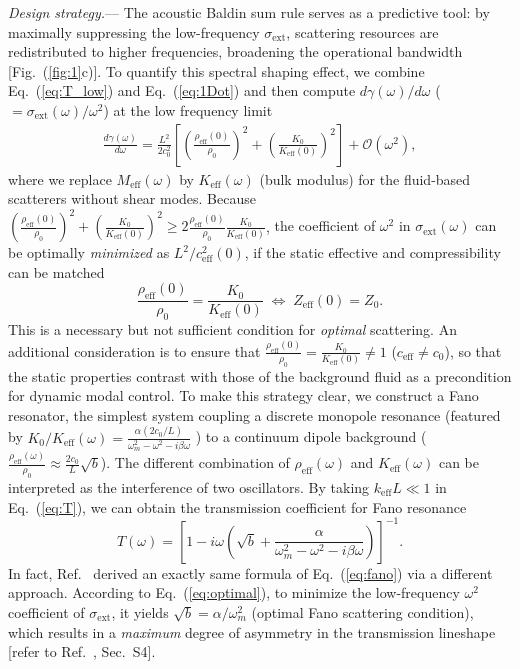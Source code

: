 \documentclass[final,5p,times,twocolumn]{elsarticle}
\begin{document}
\textit{Design strategy.}— The acoustic Baldin sum rule serves as a predictive tool: by maximally suppressing the low-frequency $\sigma_\mathrm{ext}$, scattering resources are redistributed to higher frequencies, broadening the operational bandwidth [Fig.~(\ref{fig:1}c)]. To quantify this spectral shaping effect, we combine Eq.~(\ref{eq:T_low}) and Eq.~(\ref{eq:1Dot}) and then compute $d\gamma(\omega)/d\omega$ ($={\sigma_\mathrm{ext}(\omega)}/{\omega^2} $) at the low frequency limit
\begin{align} \label{eq:sigma_low}
	\frac{d\gamma(\omega)}{d\omega} = \frac{L^2}{2 c_0^2}\left[\left(\frac{\rho_{\mathrm{eff}}(0)}{\rho_0}\right)^2+\left(\frac{K_0}{K_{\mathrm{eff}}(0)}\right)^2\right] +\mathcal{O}(\omega^2),
\end{align}
where we replace $M_{\mathrm{eff}}(\omega) $ by $K_{\mathrm{eff}}(\omega)$ (bulk modulus) for the fluid-based scatterers without shear modes. Because $\left(\frac{\rho_{\mathrm{eff}}(0)}{\rho_0}\right)^2+\left(\frac{K_0}{K_{\mathrm{eff}}(0)}\right)^2\geq 2 {\frac{\rho_{\mathrm{eff}}(0)}{\rho_0}}{\frac{K_0}{K_{\mathrm{eff}}(0)}}$, {\color{black}the coefficient of $\omega^2$ in $\sigma_{\text{ext}}(\omega)$ can be optimally \textit{minimized} as $L^2/c_\mathrm{eff}^2(0)$}, if the static effective and compressibility can be matched
\begin{equation}\label{eq:optimal}
	\frac{\rho_{\mathrm{eff}}(0)}{\rho_0}=\frac{K_0}{K_{\mathrm{eff}}(0)} \;\Leftrightarrow\; Z_{\mathrm{eff}}(0)=Z_0.
\end{equation}
{\color{black}This is a necessary but not sufficient condition for \textit{optimal} scattering. An additional consideration is to ensure that $\frac{\rho_{\mathrm{eff}}(0)}{\rho_0} = \frac{K_0}{K_{\mathrm{eff}}(0)} \neq 1$ ($c_\mathrm{eff}\neq c_0$), so that the static properties contrast with those of the background fluid as a precondition for dynamic modal control. To make this strategy clear,} we construct a Fano resonator, the simplest system coupling a discrete monopole resonance (featured by $K_0/K_{\text{eff}}(\omega)=\frac{\alpha (2c_0/L)}{\omega_m^2 - \omega^2-i \beta \omega}$ ) to a continuum dipole background ($\frac{\rho_\mathrm{eff}(\omega)}{\rho_0}\approx\frac{2c_0}{L}\sqrt{b}$). The different combination of $\rho_\mathrm{eff}(\omega)$ and $K_\mathrm{eff}(\omega)$ can be interpreted as the interference of two oscillators. By taking $k_{\mathrm{eff}} L \ll 1$ in Eq.~(\ref{eq:T}), we can obtain the transmission coefficient for Fano resonance
\begin{equation}\label{eq:fano}
	T(\omega)=\left[  1-i\omega\left(\sqrt{b}+\frac{\alpha}{\omega_m^2-\omega^2-i \beta \omega}\right)\right]  ^{-1}.
\end{equation}
In fact, Ref.~\cite{goffaux2002evidence} derived an exactly same formula of Eq.~(\ref{eq:fano}) via a different approach.  According to Eq.~(\ref{eq:optimal}), to minimize the low-frequency $\omega^2$ coefficient of $\sigma_\mathrm{ext}$, it yields $\sqrt{b}=\alpha/\omega_m^2$ (optimal Fano scattering condition), which results in a \textit{maximum} degree of asymmetry in the transmission lineshape [refer to Ref.~\cite{labelSM}, Sec.~S4].
\end{document}
